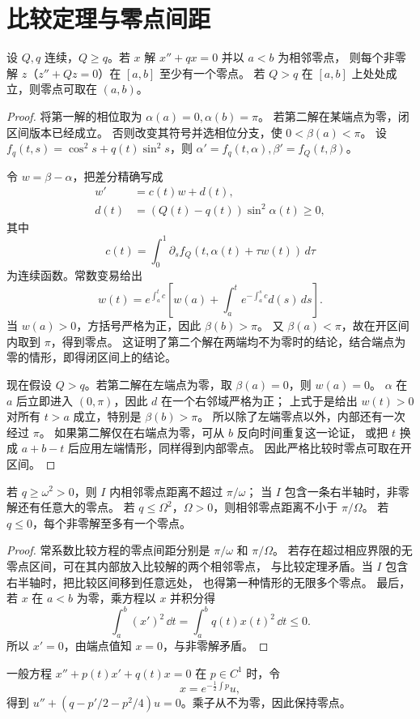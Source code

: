 \section{比较定理与零点间距}
\begin{theorem}[Sturm 比较]
设 $Q,q$ 连续，$Q\geq q$。若 $x$ 解 $x''+qx=0$ 并以 $a<b$ 为相邻零点，
则每个非零解 $z$（$z''+Qz=0$）在 $[a,b]$ 至少有一个零点。
若 $Q>q$ 在 $[a,b]$ 上处处成立，则零点可取在 $(a,b)$。
\end{theorem}
\begin{proof}
将第一解的相位取为 $\alpha(a)=0,\alpha(b)=\pi$。
若第二解在某端点为零，闭区间版本已经成立。
否则改变其符号并选相位分支，使 $0<\beta(a)<\pi$。
设 $f_q(t,s)=\cos^2s+q(t)\sin^2s$，则
$\alpha'=f_q(t,\alpha),\beta'=f_Q(t,\beta)$。

令 $w=\beta-\alpha$，把差分精确写成
\[
 \begin{aligned}
 w'&=c(t)w+d(t),\\
 d(t)&=(Q(t)-q(t))\sin^2\alpha(t)\geq0,
\end{aligned}
\]
其中
\[
 c(t)=\displaystyle\int_0^1\partial_s f_Q(t,\alpha(t)+\tau w(t))\,d\tau
\]
为连续函数。常数变易给出
\[
 w(t)=e^{\int_a^tc}\left[w(a)+\int_a^te^{-\int_a^sc}d(s)\,ds\right].
\]
当 $w(a)>0$，方括号严格为正，因此 $\beta(b)>\pi$。
又 $\beta(a)<\pi$，故在开区间内取到 $\pi$，得到零点。
这证明了第二个解在两端均不为零时的结论，结合端点为零的情形，即得闭区间上的结论。

现在假设 $Q>q$。若第二解在左端点为零，取 $\beta(a)=0$，则 $w(a)=0$。
$\alpha$ 在 $a$ 后立即进入 $(0,\pi)$，因此 $d$ 在一个右邻域严格为正；
上式于是给出 $w(t)>0$ 对所有 $t>a$ 成立，特别是 $\beta(b)>\pi$。
所以除了左端零点以外，内部还有一次经过 $\pi$。
如果第二解仅在右端点为零，可从 $b$ 反向时间重复这一论证，
或把 $t$ 换成 $a+b-t$ 后应用左端情形，同样得到内部零点。
因此严格比较时零点可取在开区间。
\end{proof}
\begin{corollary}
若 $q\geq\omega^2>0$，则 $I$ 内相邻零点距离不超过 $\pi/\omega$；
当 $I$ 包含一条右半轴时，非零解还有任意大的零点。
若 $q\leq\Omega^2$，$\Omega>0$，则相邻零点距离不小于 $\pi/\Omega$。
若 $q\leq0$，每个非零解至多有一个零点。
\end{corollary}
\begin{proof}
常系数比较方程的零点间距分别是 $\pi/\omega$ 和 $\pi/\Omega$。
若存在超过相应界限的无零点区间，可在其内部放入比较解的两个相邻零点，
与比较定理矛盾。当 $I$ 包含右半轴时，把比较区间移到任意远处，
也得第一种情形的无限多个零点。
最后，若 $x$ 在 $a<b$ 为零，乘方程以 $x$ 并积分得
\[
 \int_a^b(x')^2\,\dd t=\int_a^bq(t)x(t)^2\,\dd t\leq0.
\]
所以 $x'=0$，由端点值知 $x=0$，与非零解矛盾。
\end{proof}
一般方程 $x''+p(t)x'+q(t)x=0$ 在 $p\in C^1$ 时，令
\[
 x=e^{-\frac12\displaystyle\int p}u,
\]
得到
$u''+(q-p'/2-p^2/4)u=0$。乘子从不为零，因此保持零点。

